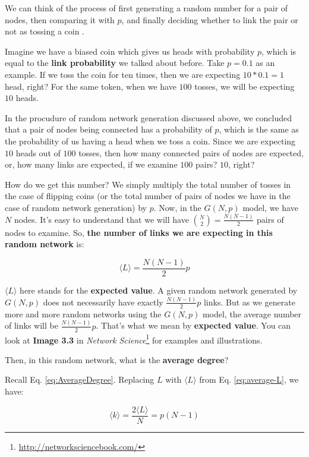 \documentclass[
]{krantz}
\renewcommand{\href}[2]{#2\footnote{\url{#1}}}
\begin{document}
We can think of the process of first generating a random number for a pair of nodes, then comparing it with \(p\), and finally deciding whether to link the pair or not as tossing a coin \citep{menczer2020first}.

Imagine we have a biased coin which gives us heads with probability \(p\), which is equal to the \textbf{link probability} we talked about before. Take \(p=0.1\) as an example. If we toss the coin for ten times, then we are expecting \(10*0.1=1\) head, right? For the same token, when we have \(100\) tosses, we will be expecting \(10\) heads.

In the procudure of random network generation discussed above, we concluded that a pair of nodes being connected has a probability of \(p\), which is the same as the probability of us having a head when we toss a coin. Since we are expecting \(10\) heads out of \(100\) tosses, then how many connected pairs of nodes are expected, or, how many links are expected, if we examine \(100\) pairs? \(10\), right?

How do we get this number? We simply multiply the total number of tosses in the case of flipping coins (or the total number of pairs of nodes we have in the case of random network generation) by \(p\).
Now, in the \(G(N,p)\) model, we have \(N\) nodes. It's easy to understand that we will have \({N \choose 2} = \frac{N(N-1)}{2}\) pairs of nodes to examine. So, \textbf{the number of links we are expecting in this random network} is:

\begin{equation}
  \langle L \rangle = \frac{N(N-1)}{2}p \label{eq:average-L}
\end{equation}

\(\langle L \rangle\) here stands for the \textbf{expected value}. A given random network generated by \(G(N,p)\) does not necessarily have exactly \(\frac{N(N-1)}{2}p\) links. But as we generate more and more random networks using the \(G(N,p)\) model, the average number of links will be \(\frac{N(N-1)}{2}p\). That's what we mean by \textbf{expected value}. You can look at \textbf{Image 3.3} in \href{http://networksciencebook.com/}{\emph{Network Science}} for examples and illustrations.

Then, in this random network, what is the \textbf{average degree}?

Recall Eq. \eqref{eq:AverageDegree}. Replacing \(L\) with \(\langle L \rangle\) from Eq. \eqref{eq:average-L}, we have:

\begin{equation}
  \langle k \rangle = \frac{2\langle L \rangle}{N} = p(N-1) \label{eq:average-D}
\end{equation}
\end{document}
